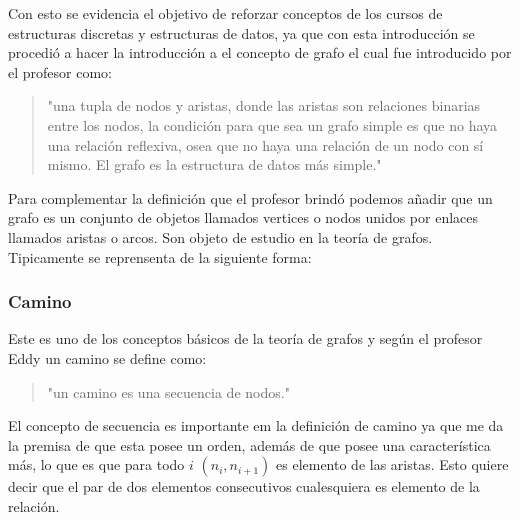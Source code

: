 \documentclass[10pt,a4paper]{article}
\begin{document}
	Con esto se evidencia el objetivo de reforzar conceptos de los cursos de estructuras discretas y estructuras de datos, ya que con esta introducción se procedió a hacer la introducción a el concepto de grafo el cual fue introducido por el profesor como:\\
	\begin{quotation}
	"una tupla de nodos y aristas, donde las aristas son relaciones binarias entre los nodos, la condición para que sea un grafo simple es que no haya una relación reflexiva, osea que no haya una relación de un nodo con sí mismo. El grafo es la estructura de datos más simple." \cite{Eddy}\\
	\end{quotation}
	\cite{Graph}
	Para complementar la definición que el profesor brindó podemos añadir que un grafo es un conjunto de objetos llamados vertices o nodos unidos por enlaces llamados aristas o arcos. Son objeto de estudio en la teoría de grafos. Tipicamente se reprensenta de la siguiente forma: 
\begin{center}
\end{center}
\subsubsection{Camino}
	Este es uno de los conceptos básicos de la teoría de grafos y según el profesor Eddy un camino se define como:\\ 
\begin{quote}
	"un camino es una secuencia de nodos."\\
	\end{quote}
	
	El concepto de secuencia es importante em la definición de camino ya que me da la premisa de que esta posee un orden, además de que posee una característica más, lo que es que para todo $i$ $(n_i, n_{i+1})$ es elemento de las aristas. Esto quiere decir que el par de dos elementos consecutivos cualesquiera es elemento de la relación.\\
	
\end{document}
